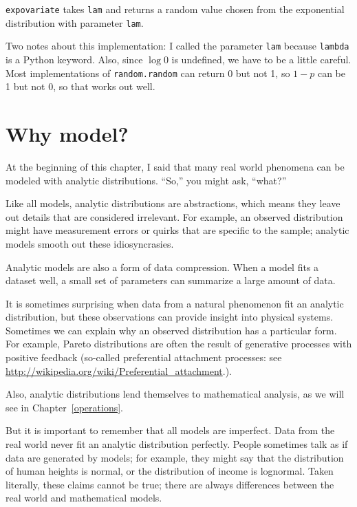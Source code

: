 \documentclass[12pt]{book}
\begin{document}
{\tt expovariate} takes {\tt lam} and returns a random value chosen
from the exponential distribution with parameter {\tt lam}.

Two notes about this implementation:
I called the parameter \verb"lam" because \verb"lambda" is a Python
keyword.  Also, since $\log 0$ is undefined, we have to
be a little careful.  Most implementations of {\tt random.random}
can return 0 but not 1, so $1 - p$ can be 1 but not 0, 
so that works out well.  


\section{Why model?}

At the beginning of this chapter, I said that many real world phenomena
can be modeled with analytic distributions.  ``So,'' you might ask,
``what?''  

Like all models, analytic distributions are abstractions, which
means they leave out details that are considered irrelevant.
For example, an observed distribution might have measurement errors
or quirks that are specific to the sample; analytic models smooth
out these idiosyncrasies.

Analytic models are also a form of data compression.  When a model
fits a dataset well, a small set of parameters can summarize a
large amount of data.

It is sometimes surprising when data from a natural phenomenon fit an
analytic distribution, but these observations can provide insight
into physical systems.  Sometimes we can explain why an observed
distribution has a particular form.  For example, Pareto distributions
are often the result of generative processes with positive feedback
(so-called preferential attachment processes: see
\url{http://wikipedia.org/wiki/Preferential_attachment}.).

Also, analytic distributions lend themselves to mathematical
analysis, as we will see in Chapter~\ref{operations}.

But it is important to remember that all models are imperfect.
Data from the real world never fit an analytic distribution perfectly.
People sometimes talk as if data are generated by models; for example,
they might say that the distribution of human heights is normal,
or the distribution of income is lognormal.  Taken literally, these
claims cannot be true; there are always differences between the
real world and mathematical models.
\end{document}
